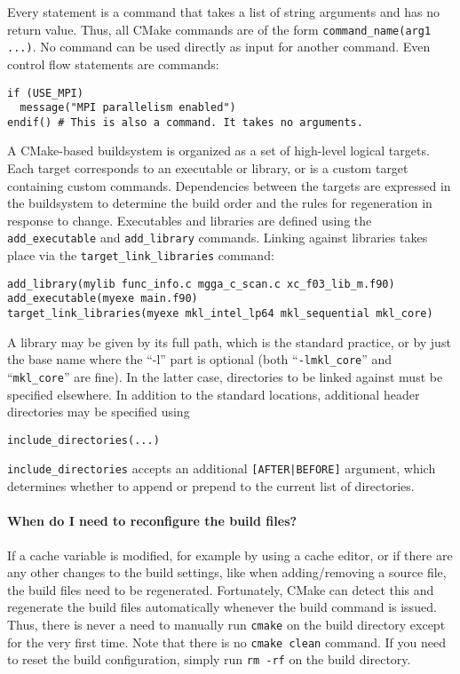 Every statement is a command that takes a list of string arguments and has no return value. Thus, all CMake commands are of the form \texttt{command\_name(arg1 ...)}. No command can be used directly as input for another command. Even control flow statements are commands:
\begin{verbatim}
if (USE_MPI)
  message("MPI parallelism enabled")
endif() # This is also a command. It takes no arguments.
\end{verbatim}

A CMake-based buildsystem is organized as a set of high-level logical targets. Each target corresponds to an executable or library, or is a custom target containing custom commands. Dependencies between the targets are expressed in the buildsystem to determine the build order and the rules for regeneration in response to change. Executables and libraries are defined using the \verb+add_executable+ and \verb+add_library+ commands. Linking against libraries takes place via the \verb+target_link_libraries+ command:
\begin{verbatim}
add_library(mylib func_info.c mgga_c_scan.c xc_f03_lib_m.f90)
add_executable(myexe main.f90)
target_link_libraries(myexe mkl_intel_lp64 mkl_sequential mkl_core)
\end{verbatim}
A library may be given by its full path, which is the standard practice, or by just the base name where the ``-l'' part is optional (both ``\texttt{-lmkl\_core}'' and ``\texttt{mkl\_core}'' are fine). In the latter case, directories to be linked against must be specified elsewhere. In addition to the standard locations, additional header directories may be specified using
\begin{verbatim}
include_directories(...)
\end{verbatim}
\texttt{include\_directories} accepts an additional \texttt{[AFTER|BEFORE]} argument, which determines whether to append or prepend to the current list of directories.

\paragraph{When do I need to reconfigure the build files?}

If a cache variable is modified, for example by using a cache editor, or if there are any other changes to the build settings, like when adding/removing a source file, the build files need to be regenerated. Fortunately, CMake can detect this and regenerate the build files automatically whenever the build command is issued. Thus, there is never a need to manually run \texttt{cmake} on the build directory except for the very first time. Note that there is no \texttt{cmake clean} command. If you need to reset the build configuration, simply run \texttt{rm -rf} on the build directory.

